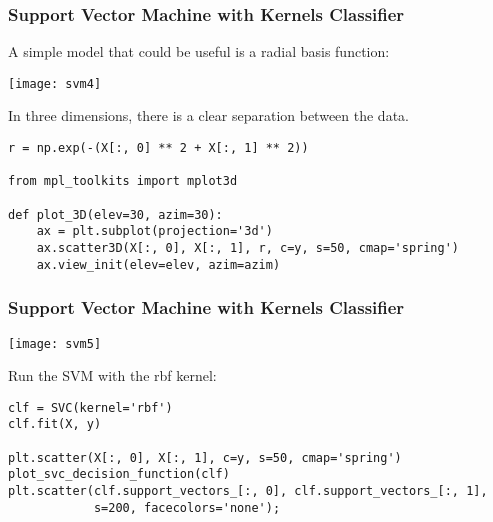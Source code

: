 \begin{frame}[fragile]\frametitle{Support Vector Machine with Kernels Classifier}
A simple model that could be useful is a radial basis function:

\begin{center}
\texttt{[image: svm4]}
\end{center}

In three dimensions, there is a clear separation between the data.

\begin{lstlisting}
r = np.exp(-(X[:, 0] ** 2 + X[:, 1] ** 2))

from mpl_toolkits import mplot3d

def plot_3D(elev=30, azim=30):
    ax = plt.subplot(projection='3d')
    ax.scatter3D(X[:, 0], X[:, 1], r, c=y, s=50, cmap='spring')
    ax.view_init(elev=elev, azim=azim)
\end{lstlisting}

\end{frame}

\begin{frame}[fragile]\frametitle{Support Vector Machine with Kernels Classifier}

\begin{center}
\texttt{[image: svm5]}
\end{center}

 Run the SVM with the rbf kernel:
\begin{lstlisting}
clf = SVC(kernel='rbf')
clf.fit(X, y)

plt.scatter(X[:, 0], X[:, 1], c=y, s=50, cmap='spring')
plot_svc_decision_function(clf)
plt.scatter(clf.support_vectors_[:, 0], clf.support_vectors_[:, 1],
            s=200, facecolors='none');
\end{lstlisting}

\end{frame}


